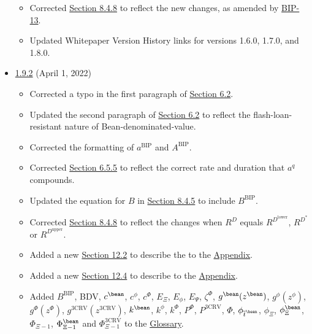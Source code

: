 \documentclass[class=article, crop=false]{standalone}
\begin{document}
\begin{itemize}[topsep=0pt, itemsep=3pt,leftmargin=16pt]
    \begin{itemize}
        \item Corrected \hyperlink{subsubsection.8.4.8}{Section 8.4.8} to reflect the new  changes, as amended by \href{https://github.com/BeanstalkFarms/Beanstalk-Governance-Proposals/blob/master/bip/bip-13-weather-changes.md}{BIP-13}.
        \item Updated Whitepaper Version History links for versions 1.6.0, 1.7.0, and 1.8.0.
    \end{itemize}
        \item \href{https://github.com/BeanstalkFarms/Beanstalk/blob/master/version-history/beanstalk1_9_2.pdf}{1.9.2} (April 1, 2022)
    \begin{itemize}
        \item Corrected a typo in the first paragraph of \hyperlink{subsection.6.2}{Section 6.2}.
        \item Updated the second paragraph of \hyperlink{subsection.6.2}{Section 6.2} to reflect the flash-loan-resistant nature of Bean-denominated-value.
        \item Corrected the formatting of $a^{\text{BIP}}$ and $A^{\text{BIP}}$.
        \item Corrected \hyperlink{subsubsection.6.5.5}{Section 6.5.5} to reflect the correct rate and duration that $a^q$ compounds.
        \item Updated the equation for $B$ in \hyperlink{subsubsection.8.4.5}{Section 8.4.5} to include $B^{\text{BIP}}$.
        \item Corrected \hyperlink{subsubsection.8.4.8}{Section 8.4.8} to reflect the  changes when $R^D$ equals $R^{D^{\text{lower}}}$, $R^{D^*}$ or $R^{D^{\text{upper}}}$.
        \item Added a new \hyperlink{subsection.12.2}{Section 12.2} to describe the   to the \hyperlink{section.14}{Appendix}.
        \item Added a new \hyperlink{subsection.12.4}{Section 12.4} to describe  to the \hyperlink{section.14}{Appendix}.
        \item Added $B^{\text{BIP}}$, BDV, $c^{\bean}$, $c^{\phi}$, $c^{\Phi}$, $E_{\Xi}$, $E_{\phi}$, $E_{\Psi}$, $\zeta^{\Phi}$, $g^{\bean}(z^{\bean})$, $g^{\phi}(z^{\phi})$, $g^{\Phi}(z^{\Phi})$, $g^{\text{3CRV}}(z^{\text{3CRV}})$, $k^{\bean}$, $k^{\phi}$, $k^{\Phi}$, $P^{\Phi}$, $P^{\text{3CRV}}$, $\Phi$, $\phi_{\overline{t}^{\bean}}$, $\phi_{\Xi}$, $\phi_{\Xi}^{\bean}$, $\Phi_{\Xi-1}$, $\Phi_{\Xi-1}^{\bean}$ and $\Phi_{\Xi-1}^{\text{3CRV}}$ to the \hyperlink{subsection.14.11}{Glossary}. 

\end{itemize}
\end{itemize}
\end{document}
